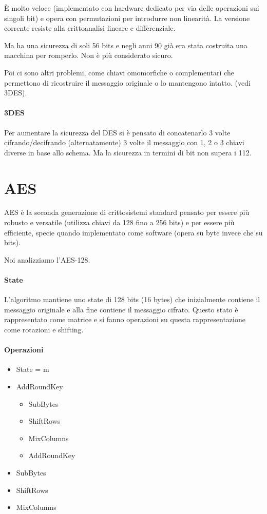 
\`E molto veloce (implementato con hardware dedicato per via delle operazioni sui singoli bit) e opera con permutazioni per introdurre non linearit\`a. La versione corrente resiste alla crittoanalisi lineare e differenziale.

Ma ha una sicurezza di soli 56 bits e negli anni 90 gi\`a era stata costruita una macchina per romperlo. Non \`e pi\`u considerato sicuro.

Poi ci sono altri problemi, come chiavi omomorfiche o complementari che permettono di ricostruire il messaggio originale o lo mantengono intatto. (vedi 3DES).

\paragraph{3DES}

Per aumentare la sicurezza del DES si \`e pensato di concatenarlo 3 volte cifrando/decifrando (alternatamente) 3 volte il messaggio con 1, 2 o 3 chiavi diverse in base allo schema. Ma la sicurezza in termini di bit non supera i 112.

\section{AES}

AES \`e la seconda generazione di crittosistemi standard pensato per essere pi\`u robusto e versatile (utilizza chiavi da 128 fino a 256 bits) e per essere pi\`u efficiente, specie quando implementato come software (opera su byte invece che su bits).

Noi analizziamo l'AES-128.

\paragraph{State}

L'algoritmo mantiene uno state di 128 bits (16 bytes) che inizialmente contiene il messaggio originale e alla fine contiene il messaggio cifrato. Questo stato \`e rappresentato come matrice e si fanno operazioni su questa rappresentazione come rotazioni e shifting.

\paragraph{Operazioni}

\begin{itemize}
  \item State = m
  \item AddRoundKey
  \begin{itemize}
  \item SubBytes
  \item ShiftRows
  \item MixColumns
  \item AddRoundKey
  \end{itemize}
  \item SubBytes
  \item ShiftRows
  \item MixColumns
\end{itemize}

